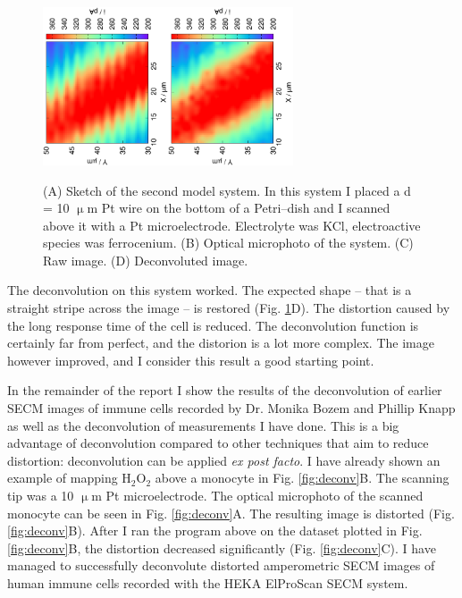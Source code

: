 \documentclass[a4paper, 11pt, oneside, bibliography=totoc]{article}
\begin{document}
\begin{figure}
\includegraphics[trim = 10mm 30mm 0mm 20mm, clip, width=0.33\textwidth, angle=-90]{7.eps}\includegraphics[trim = 10mm 30mm 0mm 20mm, clip, width=0.33\textwidth, angle=-90]{7_deconvoluted.eps}
\caption{(A) Sketch of the second model system. In this system I placed a d = 10 $\upmu$m Pt wire on the bottom of a Petri--dish and I scanned above it with a Pt microelectrode. Electrolyte was KCl, electroactive species was ferrocenium. (B) Optical microphoto of the system. (C) Raw image. (D) Deconvoluted image.}
\label{fig:wire}
\end{figure}

The deconvolution on this system worked. The expected shape -- that is a straight stripe across the image -- is restored (Fig. \ref{fig:wire}D). The distortion caused by the long response time of the cell is reduced. The deconvolution function is certainly far from perfect, and the distorion is a lot more complex. The image however improved, and I consider this result a good starting point. 

In the remainder of the report I show the results of the deconvolution of earlier SECM images of immune cells recorded by Dr. Monika Bozem and Phillip Knapp as well as the deconvolution of measurements I have done. This is a big advantage of deconvolution compared to other techniques that aim to reduce distortion: deconvolution can be applied \emph{ex post facto}. I have already shown an example of mapping H$_2$O$_2$ above a monocyte in Fig. \ref{fig:deconv}B. The scanning tip was a 10 $\upmu$m Pt microelectrode. The optical microphoto of the scanned monocyte can be seen in Fig. \ref{fig:deconv}A. The resulting image is distorted (Fig. \ref{fig:deconv}B). After I ran the program above on the dataset plotted in Fig. \ref{fig:deconv}B, the distortion decreased significantly (Fig. \ref{fig:deconv}C). I have managed to successfully deconvolute distorted amperometric SECM images of human immune cells recorded with the HEKA ElProScan SECM system.
\end{document}
